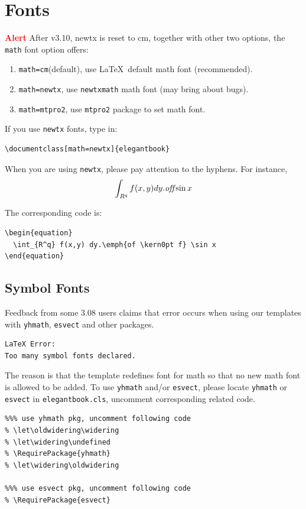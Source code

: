 \documentclass[11pt]{elegantbook}
\begin{document}
\section{Fonts}
\textcolor{red}{\bfseries Alert} After v3.10, newtx is reset to cm, together with other two options, the \lstinline{math} font option offers:
\begin{enumerate}
  \item \lstinline{math=cm}(default), use \LaTeX\ default math font (recommended).
  \item \lstinline{math=newtx}, use \lstinline{newtxmath} math font (may bring about bugs).
  \item \lstinline{math=mtpro2}, use \lstinline{mtpro2} package to set math font.
\end{enumerate}

If you use \lstinline{newtx} fonts, type in:
\begin{lstlisting}
\documentclass[math=newtx]{elegantbook}
\end{lstlisting}

When you are using \lstinline{newtx}, please pay attention to the hyphens. For instance,
\begin{equation}
\int_{R^q} f(x,y) dy.\emph{of\kern0pt f} \sin x
\end{equation}

The corresponding code is: 
\begin{lstlisting}
\begin{equation}
  \int_{R^q} f(x,y) dy.\emph{of \kern0pt f} \sin x
\end{equation}
\end{lstlisting}

\subsection{Symbol Fonts}
Feedback from some 3.08 users claims that error occurs when using our templates with  \lstinline{yhmath}, \lstinline{esvect} and other packages.
\begin{lstlisting}
LaTeX Error:
Too many symbol fonts declared.
\end{lstlisting}

The reason is that the template redefines font for math so that no new math font is allowed to be added. To use \lstinline{yhmath} and/or \lstinline{esvect}, please locate \lstinline{yhmath} or \lstinline{esvect} in \lstinline{elegantbook.cls}, uncomment corresponding related code.

\begin{lstlisting}
%%% use yhmath pkg, uncomment following code
% \let\oldwidering\widering
% \let\widering\undefined
% \RequirePackage{yhmath}
% \let\widering\oldwidering

%%% use esvect pkg, uncomment following code
% \RequirePackage{esvect}
\end{lstlisting}
\end{document}
